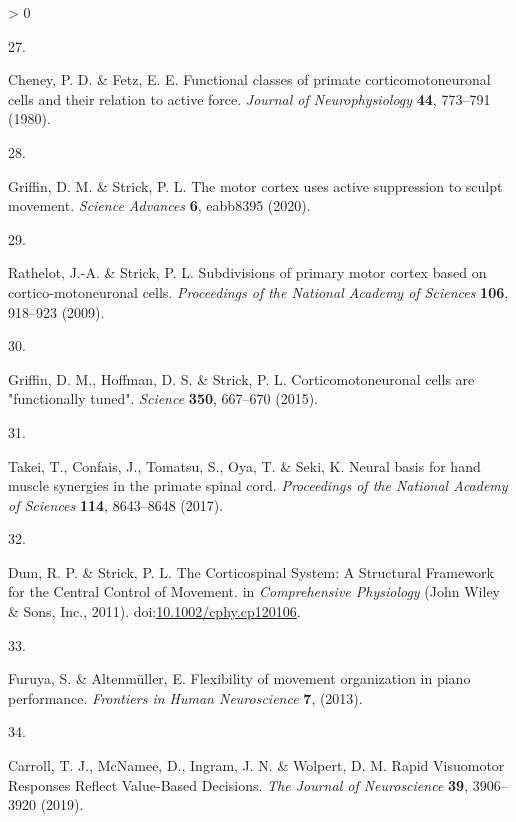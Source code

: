 \documentclass[
  a4paper,
]{article}
\newlength{\cslhangindent}
\newlength{\csllabelwidth}
\newenvironment{CSLReferences}[2] %
 {%
  \setlength{\parindent}{0pt}
  \ifodd #1 \everypar{\setlength{\hangindent}{\cslhangindent}}\ignorespaces\fi
  \ifnum #2 > 0
  \setlength{\parskip}{#2\baselineskip}
  \fi
 }%
 {}
\newcommand{\CSLLeftMargin}[1]{\parbox[t]{\csllabelwidth}{#1}}
\newcommand{\CSLRightInline}[1]{\parbox[t]{\linewidth - \csllabelwidth}{#1}\break}
\begin{document}
\begin{CSLReferences}{0}{0}
\leavevmode\hypertarget{ref-cheneyFunctionalClassesPrimate1980}{}%
\CSLLeftMargin{27. }
\CSLRightInline{Cheney, P. D. \& Fetz, E. E. Functional classes of
primate corticomotoneuronal cells and their relation to active force.
\emph{Journal of Neurophysiology} \textbf{44}, 773--791 (1980).}

\leavevmode\hypertarget{ref-griffinMotorCortexUses2020}{}%
\CSLLeftMargin{28. }
\CSLRightInline{Griffin, D. M. \& Strick, P. L. The motor cortex uses
active suppression to sculpt movement. \emph{Science Advances}
\textbf{6}, eabb8395 (2020).}

\leavevmode\hypertarget{ref-Rathelot2009}{}%
\CSLLeftMargin{29. }
\CSLRightInline{Rathelot, J.-A. \& Strick, P. L. Subdivisions of primary
motor cortex based on cortico-motoneuronal cells. \emph{Proceedings of
the National Academy of Sciences} \textbf{106}, 918--923 (2009).}

\leavevmode\hypertarget{ref-griffinCorticomotoneuronalCellsAre2015}{}%
\CSLLeftMargin{30. }
\CSLRightInline{Griffin, D. M., Hoffman, D. S. \& Strick, P. L.
Corticomotoneuronal cells are "functionally tuned". \emph{Science}
\textbf{350}, 667--670 (2015).}

\leavevmode\hypertarget{ref-Takei2017}{}%
\CSLLeftMargin{31. }
\CSLRightInline{Takei, T., Confais, J., Tomatsu, S., Oya, T. \& Seki, K.
Neural basis for hand muscle synergies in the primate spinal cord.
\emph{Proceedings of the National Academy of Sciences} \textbf{114},
8643--8648 (2017).}

\leavevmode\hypertarget{ref-dumCorticospinalSystemStructural2011}{}%
\CSLLeftMargin{32. }
\CSLRightInline{Dum, R. P. \& Strick, P. L. The {Corticospinal System}:
{A Structural Framework} for the {Central Control} of {Movement}. in
\emph{Comprehensive {Physiology}} ({John Wiley \& Sons, Inc.}, 2011).
doi:\href{https://doi.org/10.1002/cphy.cp120106}{10.1002/cphy.cp120106}.}

\leavevmode\hypertarget{ref-furuyaFlexibilityMovementOrganization2013}{}%
\CSLLeftMargin{33. }
\CSLRightInline{Furuya, S. \& Altenmüller, E. Flexibility of movement
organization in piano performance. \emph{Frontiers in Human
Neuroscience} \textbf{7}, (2013).}

\leavevmode\hypertarget{ref-carrollRapidVisuomotorResponses2019}{}%
\CSLLeftMargin{34. }
\CSLRightInline{Carroll, T. J., McNamee, D., Ingram, J. N. \& Wolpert,
D. M. Rapid {Visuomotor Responses Reflect Value}-{Based Decisions}.
\emph{The Journal of Neuroscience} \textbf{39}, 3906--3920 (2019).}


\end{CSLReferences}
\end{document}
